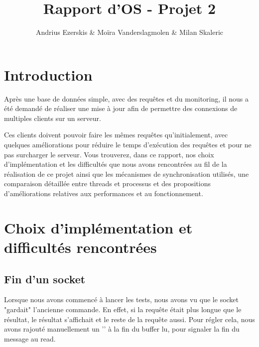\documentclass[utf8]{article}
\begin{document}
\begin{titlepage}


\author{Andrius Ezerskis \& Moïra Vanderslagmolen \& Milan Skaleric}
\title{Rapport d'OS - Projet 2}

\maketitle
\end{titlepage}
\begin{large}

\section{Introduction}
\par
\indent

Après une base de données simple, avec des requêtes et du monitoring, il nous a
été demandé de réaliser une mise à jour afin de permettre des connexions de
multiples clients sur un serveur.

\par
\par

Ces clients doivent pouvoir faire les mêmes requêtes qu'initialement, avec
quelques améliorations pour réduire le temps d'exécution des requêtes et pour ne
pas surcharger le serveur. Vous trouverez, dans ce rapport, nos choix
d'implémentation et les difficultés que nous avons rencontrées au fil de la
réalisation de ce projet ainsi que les mécanismes de synchronisation utilisés,
une comparaison détaillée entre threads et processus et des propositions
d'améliorations relatives aux performances et au fonctionnement.

\par
\section{Choix d'implémentation et difficultés rencontrées}
\subsection{Fin d'un socket}
\par
\indent

Lorsque nous avons commencé à lancer les tests, nous avons vu que le socket
"gardait" l'ancienne commande. En effet, si la requête était plus longue que le
résultat, le résultat s'affichait et le reste de la requête aussi. Pour régler
cela, nous avons rajouté manuellement un '' à la fin du buffer lu, pour
signaler la fin du message au read.   


\end{large}
\end{document}
